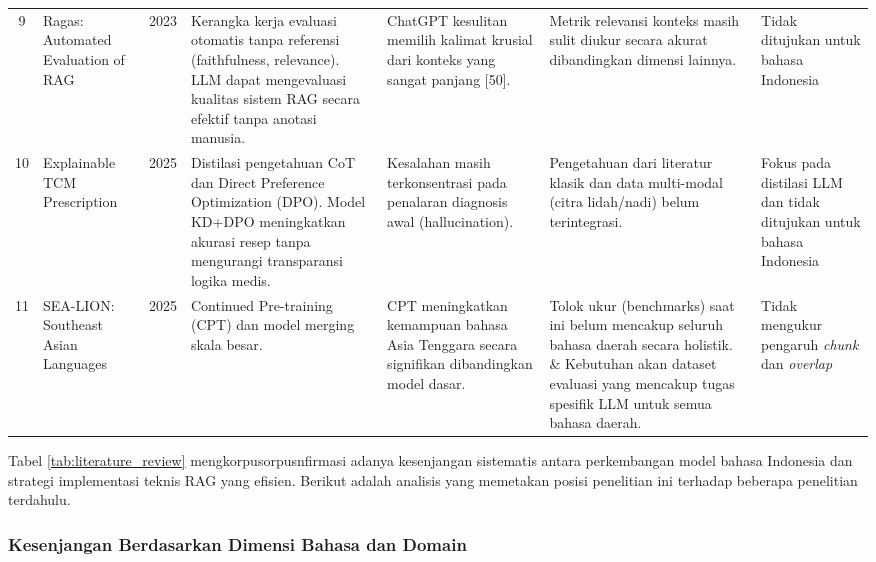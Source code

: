 \begin{landscape}
\begin{longtable}{@{} c P{3.5cm} c P{4cm} P{4cm} P{4cm} P{4cm} @{}}
    9 & Ragas: Automated Evaluation of RAG \citep{es2024ragas} & 2023 & Kerangka kerja evaluasi otomatis tanpa referensi (faithfulness, relevance). LLM dapat mengevaluasi kualitas sistem RAG secara efektif tanpa anotasi manusia. & ChatGPT kesulitan memilih kalimat krusial dari konteks yang sangat panjang [50]. & Metrik relevansi konteks masih sulit diukur secara akurat dibandingkan dimensi lainnya. & Tidak ditujukan untuk bahasa Indonesia \\

    10 & Explainable TCM Prescription \citep{wang2025reinforcement} & 2025 & Distilasi pengetahuan CoT dan Direct Preference Optimization (DPO). Model KD+DPO meningkatkan akurasi resep tanpa mengurangi transparansi logika medis. & Kesalahan masih terkonsentrasi pada penalaran diagnosis awal (hallucination). & Pengetahuan dari literatur klasik dan data multi-modal (citra lidah/nadi) belum terintegrasi. & Fokus pada distilasi LLM dan tidak ditujukan untuk bahasa Indonesia \\

    11 & SEA-LION: Southeast Asian Languages \citep{ng2025sealion} & 2025 & Continued Pre-training (CPT) dan model merging skala besar. & CPT meningkatkan kemampuan bahasa Asia Tenggara secara signifikan dibandingkan model dasar. & Tolok ukur (benchmarks) saat ini belum mencakup seluruh bahasa daerah secara holistik. \& Kebutuhan akan dataset evaluasi yang mencakup tugas spesifik LLM untuk semua bahasa daerah. & Tidak mengukur pengaruh \textit{chunk} dan \textit{overlap} \\ \hline

    \end{longtable}

\end{landscape}

Tabel \ref{tab:literature_review} mengkorpusorpusnfirmasi adanya kesenjangan sistematis antara perkembangan model bahasa Indonesia dan strategi implementasi teknis RAG yang efisien. Berikut adalah analisis yang memetakan posisi penelitian ini terhadap beberapa penelitian terdahulu.

\subsubsection{Kesenjangan Berdasarkan Dimensi Bahasa dan Domain}

